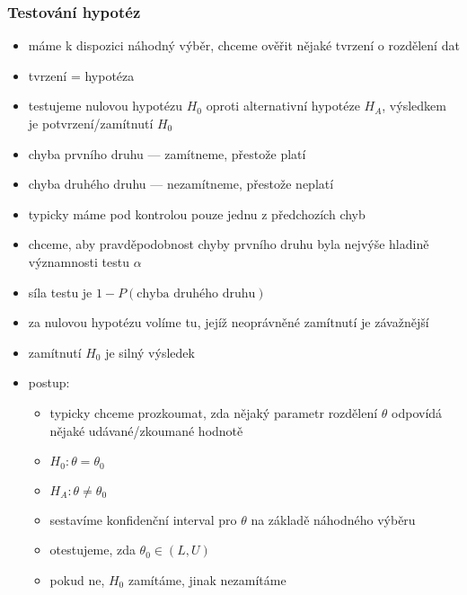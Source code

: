 \subsubsection*{Testování hypotéz}
\begin{itemize}
	\item máme k dispozici náhodný výběr, chceme ověřit nějaké tvrzení o rozdělení dat
	\item tvrzení = hypotéza
	\item testujeme nulovou hypotézu $H_0$ oproti alternativní hypotéze $H_A$, výsledkem je potvrzení/zamítnutí $H_0$
	\item chyba prvního druhu --- zamítneme, přestože platí
	\item chyba druhého druhu --- nezamítneme, přestože neplatí
	\item typicky máme pod kontrolou pouze jednu z předchozích chyb
	\item chceme, aby pravděpodobnost chyby prvního druhu byla nejvýše hladině významnosti testu $\alpha$
	\item síla testu je $1 - P(\text{chyba druhého druhu})$
	\item za nulovou hypotézu volíme tu, jejíž neoprávněné zamítnutí je závažnější 
	\item zamítnutí $H_0$ je silný výsledek
	\item postup:
	\begin{itemize}
		\item typicky chceme prozkoumat, zda nějaký parametr rozdělení $\theta$ odpovídá nějaké udávané/zkoumané hodnotě
		\item $H_0: \theta = \theta_0$
		\item $H_A: \theta \neq \theta_0$
		\item sestavíme konfidenční interval pro $\theta$ na základě náhodného výběru
		\item otestujeme, zda $\theta_0 \in (L,U)$
		\item pokud ne, $H_0$ zamítáme, jinak nezamítáme
	\end{itemize}
\end{itemize}